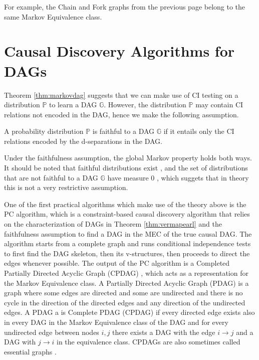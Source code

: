 \documentclass{tufte-book}
\begin{document}
For example, the Chain and Fork graphs from the previous page belong to the same Markov Equivalence class.

\section{Causal Discovery Algorithms for DAGs}
\label{sec:org5ee4609}

Theorem \ref{thm:markovdag} suggests that we can make use of CI testing on a distribution \(\mathbb{P}\) to learn a DAG \(\mathbb{G}\). However, the distribution \(\mathbb{P}\) may contain CI relations not encoded in the DAG, hence we make the following assumption.

\begin{definition}[Faithfulness]\label{def:faithfulness}

A probability distribution $\mathbb{P}$ is faithful to a DAG $\mathbb{G}$ if it entails only the CI relations encoded by the d-separations in the DAG.

\end{definition}

Under the faithfulness assumption, the global Markov property holds both ways. It should be noted that faithful distributions exist \cite{meek-1995-stron-compl}, and the set of distributions that are not faithful to a DAG \(\mathbb{G}\) have measure \(0\) \cite{uhler-2013-geomet-faith}, which suggets that in theory this is not a very restrictive assumption.



One of the first practical algorithms which make use of the theory above is the PC algorithm, \cite{spirtes-2000-causation-prediction-search,kalisch-2007-estim-high} which is a constraint-based causal discovery algorithm that relies on the characterization of DAGs in Theorem \ref{thm:vermapearl} and the faithfulness assumption to find a DAG in the MEC of the true causal DAG. The algorithm starts from a complete graph and runs conditional independence tests to first find the DAG skeleton, then its v-structures, then proceeds to direct the edges whenever possible. The output of the PC algorithm is a Completed Partially Directed Acyclic Graph (CPDAG) \cite{meek-1995-causal-infer}, which acts as a representation for the Markov Equivalence class. A Partially Directed Acyclic Graph (PDAG) is a graph where some edges are directed and some are undirected and there is no cycle in the direction of the directed edges and any direction of the undirected edges. A PDAG a is Complete PDAG (CPDAG) if every directed edge exists also in every DAG in the Markov Equivalence class of the DAG and for every undirected edge between nodes \(i,j\) there exists a DAG with the edge \(i \rightarrow j\) and a DAG with \(j \rightarrow i\) in the equivalence class. CPDAGs are also sometimes called essential graphs \cite{andersson-1997-charac-markov}.
\end{document}
